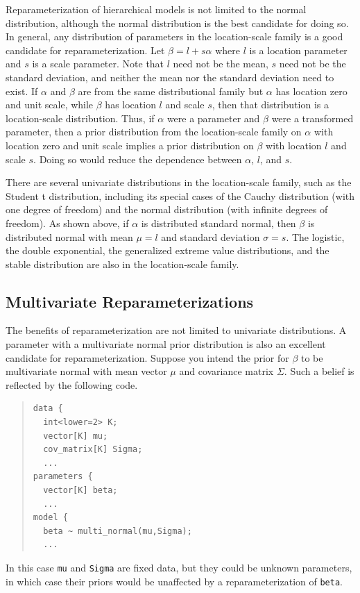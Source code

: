 Reparameterization of hierarchical models is not limited to the normal
distribution, although the normal distribution is the best candidate
for doing so. In general, any distribution of parameters in the 
location-scale family is a good candidate for reparameterization. Let
$\beta = l + s\alpha$ where $l$ is a location parameter and $s$ is a
scale parameter. Note that $l$ need not be the mean, $s$ need not
be the standard deviation, and neither the mean nor the standard
deviation need to exist. If $\alpha$ and $\beta$ are from the same
distributional family but $\alpha$ has location zero and unit scale, 
while $\beta$ has location $l$ and scale $s$, then that distribution
is a location-scale distribution. Thus, if $\alpha$ were a parameter
and $\beta$ were a transformed parameter, then a prior distribution
from the location-scale family on $\alpha$ with location zero and unit 
scale implies a prior distribution on $\beta$ with location $l$ and
scale $s$. Doing so would reduce the dependence between $\alpha$, 
$l$, and $s$.

There are several univariate distributions in the location-scale
family, such as the Student t distribution, including its special
cases of the Cauchy distribution (with one degree of freedom) and the
normal distribution (with infinite degrees of freedom). As shown above,
if $\alpha$ is distributed standard normal, then $\beta$ is distributed
normal with mean $\mu = l$ and standard deviation $\sigma = s$. The 
logistic, the double exponential, the generalized extreme value 
distributions, and the stable distribution are also in the 
location-scale family.

\subsection{Multivariate Reparameterizations}

The benefits of reparameterization are not limited to univariate 
distributions. A parameter with a multivariate normal prior distribution
is also an excellent candidate for reparameterization. Suppose you intend
the prior for $\beta$ to be multivariate normal with mean vector $\mu$
and covariance matrix $\Sigma$. Such a belief is reflected by the
following code.
%
\begin{quote}
\begin{Verbatim}
data {
  int<lower=2> K;
  vector[K] mu;
  cov_matrix[K] Sigma;
  ...
parameters {
  vector[K] beta;
  ...
model {
  beta ~ multi_normal(mu,Sigma);
  ...
\end{Verbatim}
\end{quote}
%
In this case \Verb|mu| and \Verb|Sigma| are fixed data, but they could
be unknown parameters, in which case their priors would be unaffected
by a reparameterization of \Verb|beta|.

